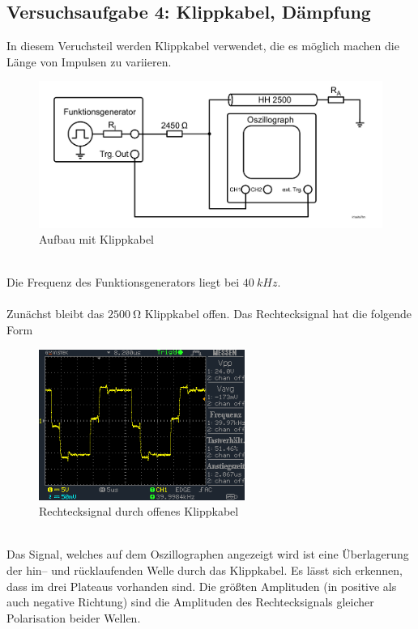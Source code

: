 \documentclass[a4paper,10pt]{article}
\numberwithin{equation}{section}
\begin{document}
\subsection{Versuchsaufgabe 4: Klippkabel, Dämpfung}
In diesem Veruchsteil werden Klippkabel verwendet, die es möglich machen die Länge von Impulsen zu variieren.
\begin{figure}[h]
        \centering
        \includegraphics[width=\textwidth]{versuchsaufgabe4.png}
        \caption{Aufbau mit Klippkabel}
\end{figure}\\
Die Frequenz des Funktionsgenerators liegt bei $\SI{40}{kHz}$.\\\\
Zunächst bleibt das $\SI{2500}{\ohm}$ Klippkabel offen.
Das Rechtecksignal hat die folgende Form
\begin{figure}[h]
        \centering
        \includegraphics[width=0.6\textwidth]{data/DS0028.BMP.png}
        \caption{Rechtecksignal durch offenes Klippkabel}
\end{figure}\\
Das Signal, welches auf dem Oszillographen angezeigt wird ist eine Überlagerung der hin-- und rücklaufenden Welle durch das Klippkabel.
Es lässt sich erkennen, dass im drei Plateaus vorhanden sind.
Die größten Amplituden (in positive als auch negative Richtung) sind die Amplituden des Rechtecksignals gleicher Polarisation beider Wellen.
\end{document}
